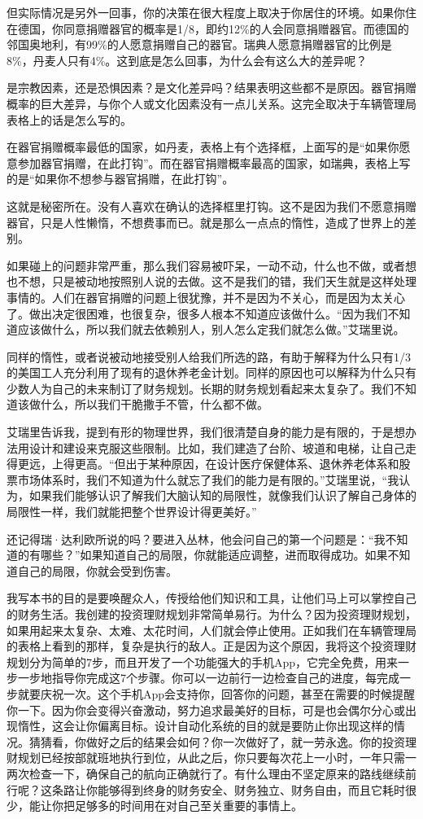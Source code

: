 但实际情况是另外一回事，你的决策在很大程度上取决于你居住的环境。如果你住在德国，你同意捐赠器官的概率是1/8，即约12\%的人会同意捐赠器官。而德国的邻国奥地利，有99\%的人愿意捐赠自己的器官。瑞典人愿意捐赠器官的比例是8\%，丹麦人只有4\%。这到底是怎么回事，为什么会有这么大的差异呢？

是宗教因素，还是恐惧因素？是文化差异吗？结果表明这些都不是原因。器官捐赠概率的巨大差异，与你个人或文化因素没有一点儿关系。这完全取决于车辆管理局表格上的话是怎么写的。

在器官捐赠概率最低的国家，如丹麦，表格上有个选择框，上面写的是“如果你愿意参加器官捐赠，在此打钩”。而在器官捐赠概率最高的国家，如瑞典，表格上写的是“如果你不想参与器官捐赠，在此打钩”。

这就是秘密所在。没有人喜欢在确认的选择框里打钩。这不是因为我们不愿意捐赠器官，只是人性懒惰，不想费事而已。就是那么一点点的惰性，造成了世界上的差别。

如果碰上的问题非常严重，那么我们容易被吓呆，一动不动，什么也不做，或者想也不想，只是被动地按照别人说的去做。这不是我们的错，我们天生就是这样处理事情的。人们在器官捐赠的问题上很犹豫，并不是因为不关心，而是因为太关心了。做出决定很困难，也很复杂，很多人根本不知道应该做什么。“因为我们不知道应该做什么，所以我们就去依赖别人，别人怎么定我们就怎么做。”艾瑞里说。

同样的惰性，或者说被动地接受别人给我们所选的路，有助于解释为什么只有1/3的美国工人充分利用了现有的退休养老金计划。同样的原因也可以解释为什么只有少数人为自己的未来制订了财务规划。长期的财务规划看起来太复杂了。我们不知道该做什么，所以我们干脆撒手不管，什么都不做。

艾瑞里告诉我，提到有形的物理世界，我们很清楚自身的能力是有限的，于是想办法用设计和建设来克服这些限制。比如，我们建造了台阶、坡道和电梯，让自己走得更远，上得更高。“但出于某种原因，在设计医疗保健体系、退休养老体系和股票市场体系时，我们不知道为什么就忘了我们的能力是有限的。”艾瑞里说，“我认为，如果我们能够认识了解我们大脑认知的局限性，就像我们认识了解自己身体的局限性一样，我们就能把整个世界设计得更美好。”

还记得瑞·达利欧所说的吗？要进入丛林，他会问自己的第一个问题是：“我不知道的有哪些？”如果知道自己的局限，你就能适应调整，进而取得成功。如果不知道自己的局限，你就会受到伤害。

我写本书的目的是要唤醒众人，传授给他们知识和工具，让他们马上可以掌控自己的财务生活。我创建的投资理财规划非常简单易行。为什么？因为投资理财规划，如果用起来太复杂、太难、太花时间，人们就会停止使用。正如我们在车辆管理局的表格上看到的那样，复杂是执行的敌人。正是因为这个原因，我将这个投资理财规划分为简单的7步，而且开发了一个功能强大的手机App，它完全免费，用来一步一步地指导你完成这7个步骤。你可以一边前行一边检查自己的进度，每完成一步就要庆祝一次。这个手机App会支持你，回答你的问题，甚至在需要的时候提醒你一下。因为你会变得兴奋激动，努力追求最美好的目标，可是也会偶尔分心或出现惰性，这会让你偏离目标。设计自动化系统的目的就是要防止你出现这样的情况。猜猜看，你做好之后的结果会如何？你一次做好了，就一劳永逸。你的投资理财规划已经按部就班地执行到位，从此之后，你只要每次花上一小时，一年只需一两次检查一下，确保自己的航向正确就行了。有什么理由不坚定原来的路线继续前行呢？这条路让你能够得到终身的财务安全、财务独立、财务自由，而且它耗时很少，能让你把足够多的时间用在对自己至关重要的事情上。


